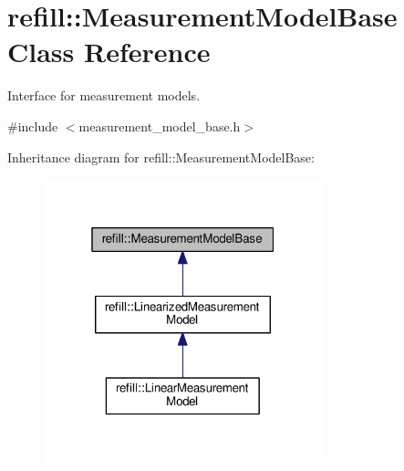 \hypertarget{classrefill_1_1MeasurementModelBase}{}\section{refill\+:\+:Measurement\+Model\+Base Class Reference}
\label{classrefill_1_1MeasurementModelBase}


Interface for measurement models.  




{\ttfamily \#include $<$measurement\+\_\+model\+\_\+base.\+h$>$}



Inheritance diagram for refill\+:\+:Measurement\+Model\+Base\+:\nopagebreak
\begin{figure}[H]
\begin{center}
\leavevmode
\includegraphics[width=229pt]{classrefill_1_1MeasurementModelBase__inherit__graph}
\end{center}
\end{figure}
